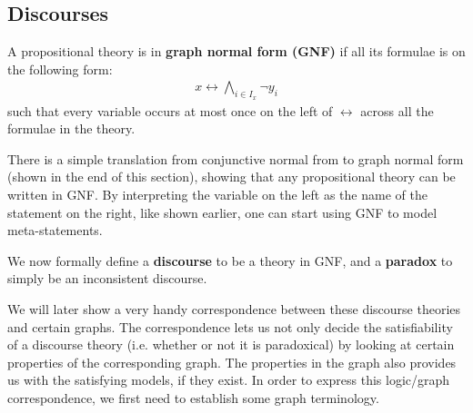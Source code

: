 \subsection{Discourses}
\label{sub:Discourses}
A propositional theory is in \textbf{graph normal form (GNF)} if all its formulae is on the following form:
\begin{align}
  x \leftrightarrow \bigwedge_{i \in I_x} \neg y_i
\end{align}
such that every variable occurs at most once on the left of $\leftrightarrow$ across all the formulae in the theory.

There is a simple translation from conjunctive normal from to graph normal form (shown in the end of this section), showing that any propositional theory can be written in GNF. By interpreting the variable on the left as the name of the statement on the right, like shown earlier, one can start using GNF to model meta-statements.

We now formally define a \textbf{discourse} to be a theory in GNF, and a \textbf{paradox} to simply be an inconsistent discourse.

We will later show a very handy correspondence between these discourse theories and certain graphs.
The correspondence lets us not only decide the satisfiability of a discourse theory (i.e. whether or not it is paradoxical) by looking at certain properties of the corresponding graph.  The properties in the graph also provides us with the satisfying models, if they exist.
In order to express this logic/graph correspondence, we first need to establish some graph terminology.
